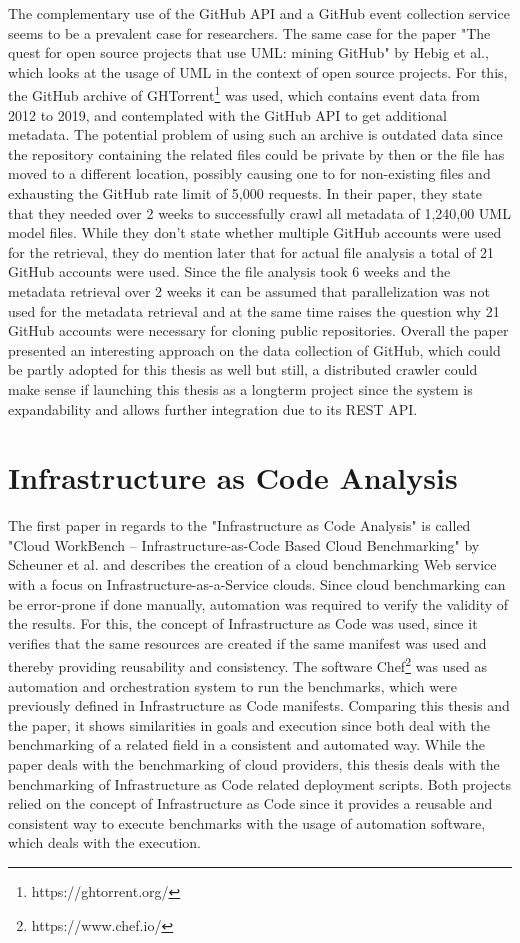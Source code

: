 The complementary use of the GitHub API and a GitHub event collection service seems to be a prevalent case for researchers. The same case for the paper "The quest for open source projects that use UML: mining GitHub" \cite{0.1145/2976767.2976778} by Hebig et al., which looks at the usage of UML in the context of open source projects. For this, the GitHub archive of GHTorrent\footnote{https://ghtorrent.org/} was used, which contains event data from 2012 to 2019, and contemplated with the GitHub API to get additional metadata. The potential problem of using such an archive is outdated data since the repository containing the related files could be private by then or the file has moved to a different location, possibly causing one to for non-existing files and exhausting the GitHub rate limit of 5,000 requests. In their paper, they state that they needed over 2 weeks to successfully crawl all metadata of 1,240,00 UML model files. While they don't state whether multiple GitHub accounts were used for the retrieval, they do mention later that for actual file analysis a total of 21 GitHub accounts were used. Since the file analysis took 6 weeks and the metadata retrieval over 2 weeks it can be assumed that parallelization was not used for the metadata retrieval and at the same time raises the question why 21 GitHub accounts were necessary for cloning public repositories. Overall the paper presented an interesting approach on the data collection of GitHub, which could be partly adopted for this thesis as well but still, a distributed crawler could make sense if launching this thesis as a longterm project since the system is expandability and allows further integration due to its REST API.

\section{Infrastructure as Code Analysis}
\label{sec:iaca}
The first paper in regards to the "Infrastructure as Code Analysis" is called "Cloud WorkBench – Infrastructure-as-Code Based Cloud Benchmarking" \cite{cloudworkbench} by Scheuner et al. and describes the creation of a cloud benchmarking Web service with a focus on Infrastructure-as-a-Service clouds. Since cloud benchmarking can be error-prone if done manually, automation was required to verify the validity of the results. For this, the concept of Infrastructure as Code was used, since it verifies that the same resources are created if the same manifest was used and thereby providing reusability and consistency. The software Chef\footnote{https://www.chef.io/} was used as automation and orchestration system to run the benchmarks, which were previously defined in Infrastructure as Code manifests. Comparing this thesis and the paper, it shows similarities in goals and execution since both deal with the benchmarking of a related field in a consistent and automated way. While the paper deals with the benchmarking of cloud providers, this thesis deals with the benchmarking of Infrastructure as Code related deployment scripts. Both projects relied on the concept of Infrastructure as Code since it provides a reusable and consistent way to execute benchmarks with the usage of automation software, which deals with the execution.

